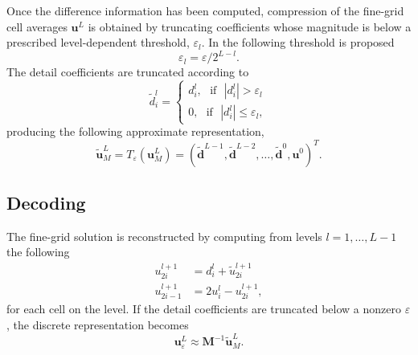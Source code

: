 \documentclass[12pt,letterpaper]{article}
\begin{document}
        Once the difference information has been computed, compression of the
        fine-grid cell averages $\bm{u}^{L}$ is obtained by truncating
        coefficients whose magnitude is below a prescribed level-dependent
        threshold, $\varepsilon_{l}$.  In \cite{harten1994} the following
        threshold is proposed
        \begin{equation}
            \varepsilon_{l} = \varepsilon / 2^{L-l}.
        \end{equation}
        The detail coefficients are truncated according to
        \begin{equation}
            \tilde{d}^{l}_{i} =
                \begin{cases}
                    d^{l}_{i}, \text{ } \text{if} \text{ } |d^{l}_{i}| > \varepsilon_{l} \\
                    0, \text{ } \text{if} \text{ } |d^{l}_{i}| \leq
                    \varepsilon_{l},
                \end{cases}
        \end{equation}
        producing the following approximate representation,
        \begin{equation}
            \tilde{\bm{u}}^{L}_{M} = T_{\varepsilon}(\bm{u}^{L}_{M}) = \left(
            \tilde{\bm{d}}^{L-1}, \tilde{\bm{d}}^{L-2},
            \dots, \tilde{\bm{d}}^{0}, \bm{u}^{0} \right)^{T}.
        \end{equation}
        
    \subsection*{Decoding}

        The fine-grid solution is reconstructed by computing from levels
        $l=1,\dots,L-1$ the following
        \begin{align}
            u_{2i}^{l+1} & = d_{i}^{l} + \tilde{u}_{2i}^{l+1} \\
            u_{2i-1}^{l+1} & = 2 u_{i}^{l} - u_{2i}^{l+1},
        \end{align}
        for each cell on the level.  If the detail coefficients are truncated
        below a nonzero $\varepsilon$, the discrete representation becomes
        \begin{equation}
            \bm{u}^{L}_{\varepsilon} \approx \bm{M}^{-1} \tilde{\bm{u}}^{L}_{M}.
        \end{equation}
\end{document}
